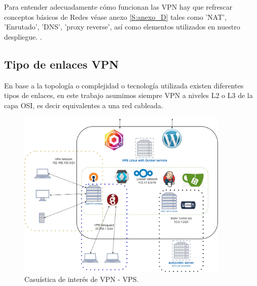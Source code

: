 Para entender adecuadamente cómo funcionan las VPN hay que refrescar conceptos básicos de Redes véase anexo \ref{S:anexo_D} tales como 'NAT', 'Enrutado', 'DNS', 'proxy reverse', así como elementos utilizados en nuestro despliegue. .

\subsection{Tipo de enlaces VPN}

En base a la topología o complejidad o tecnología utilizada existen diferentes tipos de enlaces, en este trabajo asumimos siempre VPN a niveles L2 o L3 de la capa OSI\cite{c_osi}, es decir equivalentes a una red cableada.

\begin{figure}[!htb]
\begin{center}
\includegraphics[width=0.9\textwidth]{./figuras/entorno_redes}
\caption{Casuística de interés de VPN - VPS.}
\label{F:entorno_redes}
\end{center}
\end{figure}

